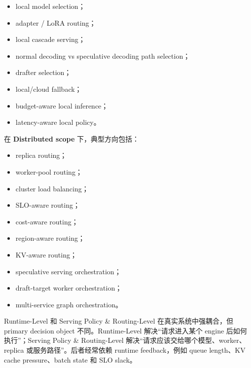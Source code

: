 \documentclass[a4paper,twocolumn,10pt]{ctexart}
\begin{document}
\begin{itemize}
\item local model selection；

\item adapter / LoRA routing；

\item local cascade serving；

\item normal decoding vs speculative decoding path selection；

\item drafter selection；

\item local/cloud fallback；

\item budget-aware local inference；

\item latency-aware local policy。

\end{itemize}
在 \textbf{Distributed scope} 下，典型方向包括：


\begin{itemize}
\item replica routing；

\item worker-pool routing；

\item cluster load balancing；

\item SLO-aware routing；

\item cost-aware routing；

\item region-aware routing；

\item KV-aware routing；

\item speculative serving orchestration；

\item draft-target worker orchestration；

\item multi-service graph orchestration。

\end{itemize}
Runtime-Level 和 Serving Policy \& Routing-Level 在真实系统中强耦合，但 primary decision object 不同。Runtime-Level 解决“请求进入某个 engine 后如何执行”；Serving Policy \& Routing-Level 解决“请求应该交给哪个模型、worker、replica 或服务路径”。后者经常依赖 runtime feedback，例如 queue length、KV cache pressure、batch state 和 SLO slack。
\end{document}
